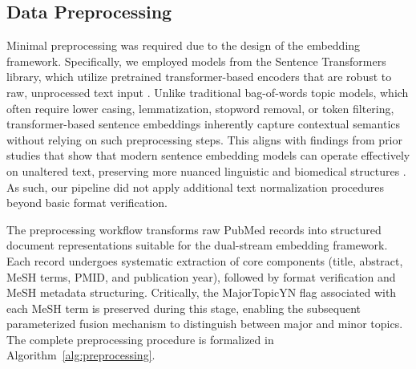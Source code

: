 \documentclass[utf8]{FrontiersinHarvard}
\begin{document}
\subsection{Data Preprocessing}
Minimal preprocessing was required due to the design of the embedding framework. Specifically, we employed models from the Sentence Transformers library, which utilize pretrained transformer-based encoders that are robust to raw, unprocessed text input \citep{reimers_sentence-bert_2019}. Unlike traditional bag-of-words topic models, which often require lower casing, lemmatization, stopword removal, or token filtering, transformer-based sentence embeddings inherently capture contextual semantics without relying on such preprocessing steps. This aligns with findings from prior studies that show that modern sentence embedding models can operate effectively on unaltered text, preserving more nuanced linguistic and biomedical structures \citep{wang_graph-embedded_2022}. As such, our pipeline did not apply additional text normalization procedures beyond basic format verification.

The preprocessing workflow transforms raw PubMed records into structured document representations suitable for the dual-stream embedding framework. Each record undergoes systematic extraction of core components (title, abstract, MeSH terms, PMID, and publication year), followed by format verification and MeSH metadata structuring. Critically, the MajorTopicYN flag associated with each MeSH term is preserved during this stage, enabling the subsequent parameterized fusion mechanism to distinguish between major and minor topics. The complete preprocessing procedure is formalized in Algorithm~\ref{alg:preprocessing}.
\end{document}
